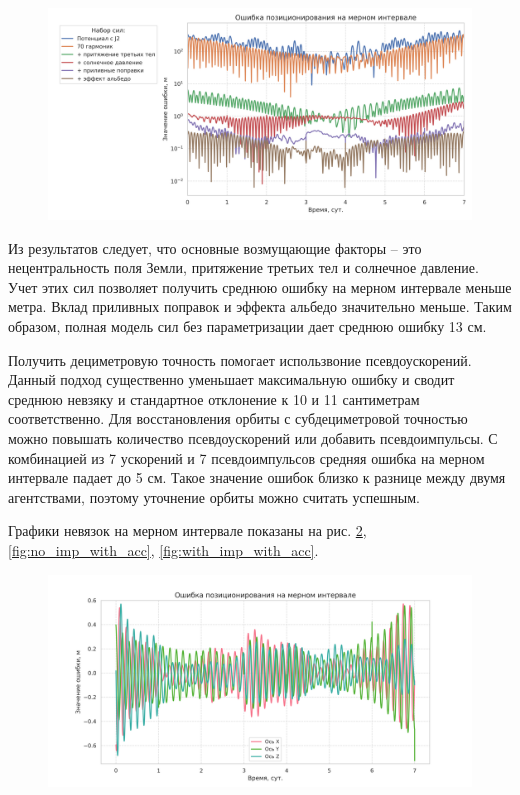 \begin{figure}[h!]
    \centering
    \includegraphics[width=\linewidth]{../images/solution/lageos/step_by_step.png}
    \label{fig:step_by_step}
 \end{figure}

Из результатов следует, что основные возмущающие факторы -- это нецентральность поля Земли,
притяжение третьих тел и солнечное давление. Учет этих сил позволяет получить среднюю
ошибку на мерном интервале меньше метра. Вклад приливных поправок и эффекта альбедо
значительно меньше. Таким образом, полная модель сил без параметризации дает среднюю ошибку
13 см.

Получить дециметровую точность помогает использвоние псевдоускорений. Данный подход
существенно уменьшает максимальную ошибку и сводит среднюю невзяку и стандартное отклонение
 к 10 и 11 сантиметрам соответственно. Для восстановления орбиты с субдециметровой точностью
 можно повышать количество псевдоускорений или добавить псевдоимпульсы. С комбинацией
 из 7 ускорений и 7 псевдоимпульсов средняя ошибка на мерном интервале падает до 5 см. 
 Такое значение ошибок близко к разнице между двумя агентствами, поэтому
 уточнение орбиты можно считать успешным.

Графики невязок на мерном интервале показаны на рис. \ref{fig:no_imp_no_acc}, 
\ref{fig:no_imp_with_acc}, \ref{fig:with_imp_with_acc}.

\begin{figure}[h!]
   \centering
   \includegraphics[width=\linewidth]{../images/solution/lageos/no_imp_no_acc.png}
   \label{fig:no_imp_no_acc}
\end{figure}

